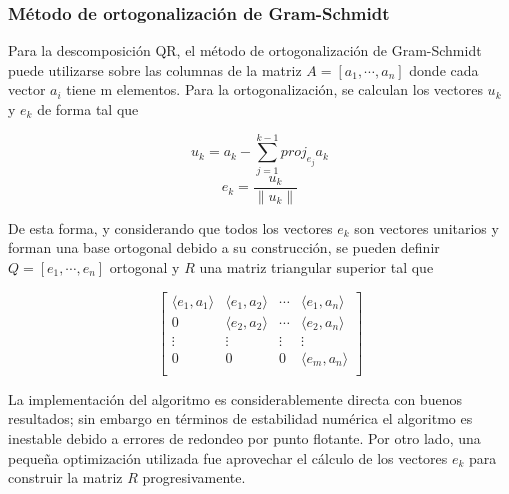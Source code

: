 \documentclass[journal, monochrome]{IEEEtran}
\begin{document}
\vspace{0.5cm}
\subsubsection{Método de ortogonalización de Gram-Schmidt}
\par
Para la descomposición QR, el método de ortogonalización de Gram-Schmidt puede utilizarse sobre las columnas de la matriz $ A = [ a_1, \cdots , a_n ] $ donde cada vector $a_{i}$ tiene m elementos. Para la ortogonalización, se calculan los vectores $u_k$ y $e_k$ de forma tal que

\begin{equation}
u_{k} = a_{k} - \sum_{j=1}^{k-1} proj_{e_{j}}a_{k}
\end{equation}
\begin{equation}
e_{k} = \frac{u_k}{\parallel u_k \parallel}
\end{equation}

De esta forma, y considerando que todos los vectores $e_k$ son vectores unitarios y forman una base ortogonal debido a su construcción, se pueden definir $ Q = [ e_1, \cdots , e_n ] $ ortogonal y $R$ una matriz triangular superior tal que

\begin{equation}
\left[
\begin{array}{cccc}
\langle e_1, a_1 \rangle & \langle e_1, a_2 \rangle & \cdots & \langle e_1, a_n \rangle \\
0 & \langle e_2, a_2 \rangle & \cdots & \langle e_2, a_n \rangle \\
\vdots & \vdots & \vdots & \vdots \\
0 & 0 & 0 & \langle e_m, a_n \rangle \\
\end{array}
\right]
\end{equation}

La implementación del algoritmo es considerablemente directa con buenos resultados; sin embargo en términos de estabilidad numérica el algoritmo es inestable debido a errores de redondeo por punto flotante. 
Por otro lado, una pequeña optimización utilizada fue aprovechar el cálculo de los vectores $e_k$ para construir la matriz $R$ progresivamente.


\vspace{0.5cm}
\end{document}
